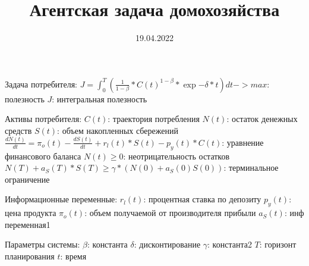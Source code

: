 \documentclass[12pt]{article}
\title{Агентская задача домохозяйства}
\date{19.04.2022}
\begin{document}
Задача потребителя:
    $J = \int_0^T (\frac{1}{1-\beta} * C(t)^{1-\beta} * \exp{-\delta*t})dt -> max$: полезность
    $J$: интегральная полезность

Активы потребителя:
    $C(t)$: траектория потребления
    $N(t)$: остаток денежных средств
    $S(t)$: объем накопленных сбережений
    $\frac{dN(t)}{dt} = \pi_{o}(t) - \frac{dS(t)}{dt} + r_{l}(t) * S(t) - p_{y}(t) * C(t)$: уравнение финансового баланса
    $N(t) \geq 0$: неотрицательность остатков
    $N(T) + a_{S}(T) * S(T) \geq \gamma * (N(0) + a_{S}(0)S(0))$: терминальное ограничение

Информационные переменные:
    $r_{l}(t)$: процентная ставка по депозиту
    $p_{y}(t)$: цена продукта
    $\pi_{o}(t)$: объем получаемой от производителя прибыли
    $a_{S}(t)$: инф переменная1

Параметры системы:
    $\beta$: константа
    $\delta$: дисконтирование
    $\gamma$: константа2
    $T$: горизонт планирования
    $t$: время
\end{document}
